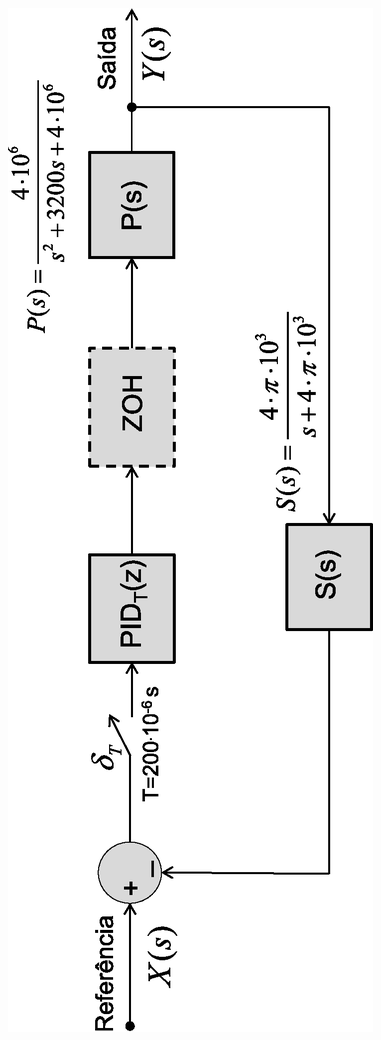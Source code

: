 \begin{figure}[!ht]
	\centering
	\includegraphics[scale = .5, angle =-90]{Imagens/PID.eps}
	\caption{}
	\label{}
\end{figure}

